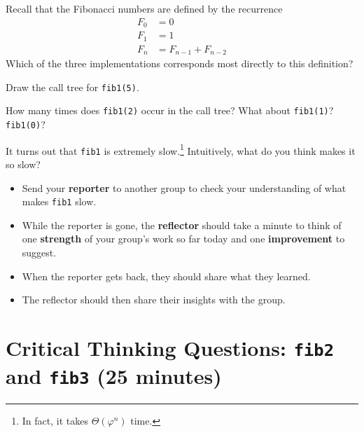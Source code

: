 \documentclass{tufte-handout}
\begin{document}
\begin{questions}
\item Recall that the Fibonacci numbers are defined by the recurrence
  \begin{align*}
    F_0 &= 0 \\ F_1 &= 1 \\ F_n &= F_{n-1} + F_{n-2}
  \end{align*}
  Which of the three implementations corresponds most directly to
  this definition?
\item Draw the call tree for \verb|fib1(5)|. \vspace{1in}
\item How many times does \verb|fib1(2)| occur in the call tree?
  What about \verb|fib1(1)|?  \verb|fib1(0)|?
\item It turns out that \verb|fib1| is extremely slow.\footnote{In
    fact, it takes $\Theta(\varphi^n)$ time.}  Intuitively, what do
  you think makes it so slow?
\end{questions}

  \begin{fullwidth}
  \begin{mdframed}
    \begin{itemize}
    \item Send your \textbf{reporter} to another group to check your
      understanding of what makes \verb|fib1| slow.
    \item While the reporter is gone, the \textbf{reflector} should
      take a minute to think of one \textbf{strength} of your group's
      work so far today and one \textbf{improvement} to suggest.
    \item When the reporter gets back, they should share what they
      learned.
    \item The reflector should then share their insights with the
      group.
    \end{itemize}
  \end{mdframed}
  \end{fullwidth}
\pause

\section{Critical Thinking Questions: \texttt{fib2} and \texttt{fib3}
  (25 minutes)}
\end{document}
